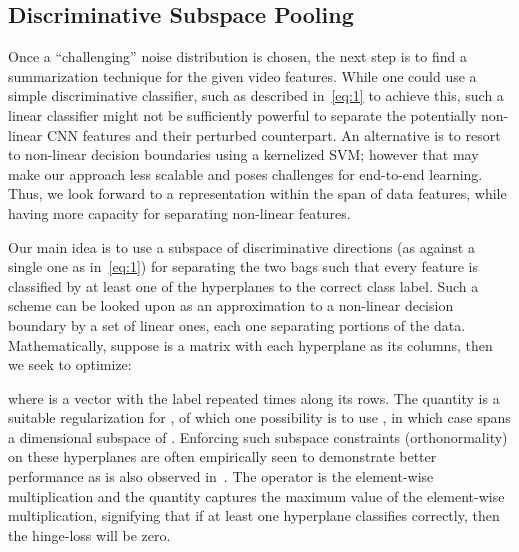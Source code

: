 \documentclass[runningheads]{llncs}
\begin{document}
\subsection{Discriminative Subspace Pooling}
Once a ``challenging'' noise distribution is chosen, the next step is to find a summarization technique for the given video features. While one could use a simple discriminative classifier, such as described in~\eqref{eq:1} to achieve this, such a linear classifier might not be sufficiently powerful to separate the potentially non-linear CNN features and their perturbed counterpart. An alternative is to resort to non-linear decision boundaries using a kernelized SVM; however that may make our approach less scalable and poses challenges for end-to-end learning. Thus, we look forward to a representation within the span of data features, while having more capacity for separating non-linear features.  

Our main idea is to use a subspace of discriminative directions (as against a single one as in~\eqref{eq:1}) for separating the two bags such that every feature  is classified by at least one of the hyperplanes to the correct class label. Such a scheme can be looked upon as an approximation to a non-linear decision boundary by a set of linear ones, each one separating portions of the data. Mathematically, suppose  is a matrix with each hyperplane as its columns, then we seek to optimize:

where  is a vector with the label  repeated  times along its rows. The quantity  is a suitable regularization for , of which one possibility is to use , in which case  spans a  dimensional subspace of . Enforcing such subspace constraints (orthonormality) on these hyperplanes are often empirically seen to demonstrate better performance as is also observed in~\cite{grp}. The operator  is the element-wise multiplication and the quantity  captures the maximum value of the element-wise multiplication, signifying that if at least one hyperplane classifies  correctly, then the hinge-loss will be zero. 
\end{document}
